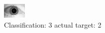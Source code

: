 \begin{figure}[h!]
\begin{center}
\includegraphics[width=0.60\columnwidth]{figures/ID1686_class_3_target_2.png}
\end{center}
\caption{ Classification: 3 actual target: 2}
\label{fig:ID1686_class_3_target_2}
\end{figure}
